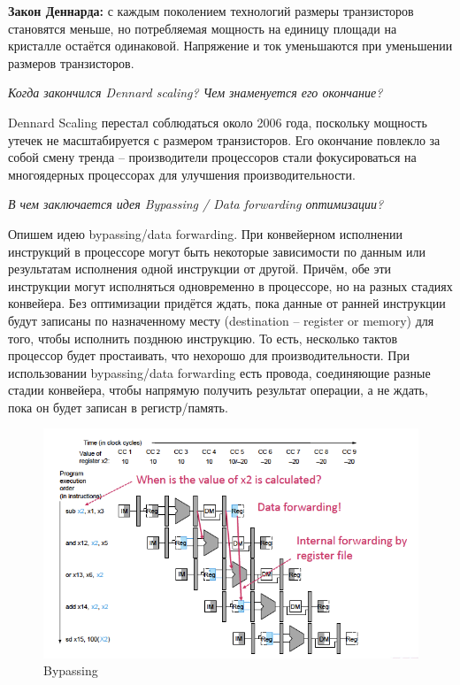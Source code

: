 	\textbf{Закон Деннарда:} с каждым поколением технологий размеры транзисторов становятся меньше, но потребляемая мощность на единицу площади на кристалле остаётся одинаковой. Напряжение и ток уменьшаются при уменьшении размеров транзисторов.
	
	\textit{Когда закончился Dennard scaling? Чем знаменуется его окончание?}
	
	Dennard Scaling перестал соблюдаться около 2006 года, поскольку мощность утечек не масштабируется с размером транзисторов. Его окончание повлекло за собой смену тренда -- производители процессоров стали фокусироваться на многоядерных процессорах для улучшения производительности.
	
	\textit{В чем заключается идея Bypassing / Data forwarding оптимизации?}
	
	Опишем идею bypassing/data forwarding. При конвейерном исполнении инструкций в процессоре могут быть некоторые зависимости по данным или результатам исполнения одной инструкции от другой. Причём, обе эти инструкции могут исполняться одновременно в процессоре, но на разных стадиях конвейера. Без оптимизации придётся ждать, пока данные от ранней инструкции будут записаны по назначенному месту (destination -- register or memory) для того, чтобы исполнить позднюю инструкцию. То есть, несколько тактов процессор будет простаивать, что нехорошо для производительности. При использовании bypassing/data forwarding есть провода, соединяющие разные стадии конвейера, чтобы напрямую получить результат операции, а не ждать, пока он будет записан в регистр/память.
	\begin{figure}[h!]
		\centering
		\includegraphics[width=\linewidth]{pictures/bypassing.png}
		\caption{Bypassing}
	\end{figure}
	
